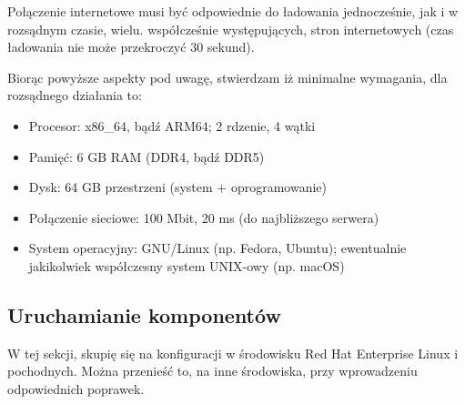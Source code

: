 \documentclass[a4paper, 12pt]{article}
\begin{document}
Połączenie internetowe musi być odpowiednie do ładowania jednocześnie, jak i w rozsądnym czasie, wielu. współcześnie występujących, stron internetowych (czas ładowania nie może przekroczyć 30 sekund).

Biorąc powyższe aspekty pod uwagę, stwierdzam iż minimalne wymagania, dla rozsądnego działania to:

\begin{itemize}
\item Procesor: x86\_64, bądź ARM64; 2 rdzenie, 4 wątki
\item Pamięć: 6 GB RAM (DDR4, bądź DDR5)
\item Dysk: 64 GB przestrzeni (system + oprogramowanie)
\item Połączenie sieciowe: 100 Mbit, 20 ms (do najbliższego serwera)
\item System operacyjny: GNU/Linux (np. Fedora, Ubuntu); ewentualnie jakikolwiek współczesny system UNIX-owy (np. macOS)
\end{itemize}

\subsection{Uruchamianie komponentów}
W tej sekcji, skupię się na konfiguracji w środowisku Red Hat Enterprise Linux i pochodnych. Można przenieść to, na inne środowiska, przy wprowadzeniu odpowiednich poprawek.
\end{document}
